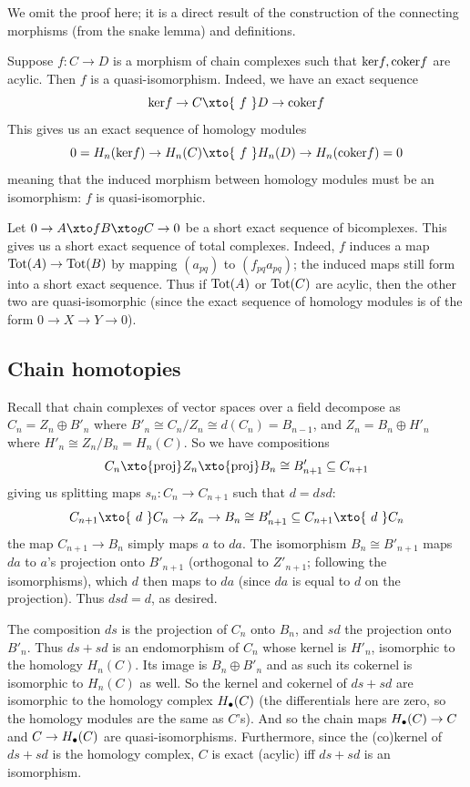 \eprop

We omit the proof here; it is a direct result of the construction of the connecting morphisms (from the snake lemma) and definitions.

\bexam

    Suppose $f\colon C\to D$ is a morphism of chain complexes such that ${\rm ker} f,{\rm coker} f$ are acylic.
    Then $f$ is a quasi-isomorphism.
    Indeed, we have an exact sequence
    $$ \ker f \to C \xto{\ f\ } D \to \coker f $$
    This gives us an exact sequence of homology modules
    $$ 0 = H_n(\ker f) \to H_n(C) \xto{\ f\ } H_n(D) \to H_n(\coker f) = 0 $$
    meaning that the induced morphism between homology modules must be an isomorphism: $f$ is quasi-isomorphic.

\eexam

\bexam

    Let $0\to A\xto f B\xto g C\to0$ be a short exact sequence of bicomplexes.
    This gives us a short exact sequence of total complexes.
    Indeed, $f$ induces a map ${\rm Tot}(A)\to{\rm Tot}(B)$ by mapping $(a_{pq})$ to $(f_{pq}a_{pq})$; the induced maps still form into a short exact sequence.
    Thus if ${\rm Tot}(A)$ or ${\rm Tot}(C)$ are acylic, then the other two are quasi-isomorphic (since the exact sequence of homology modules is of the form $0\to X\to Y\to0$).

\eexam

\subsection{Chain homotopies}

Recall that chain complexes of vector spaces over a field decompose as $C_n=Z_n\oplus B'_n$ where $B'_n\cong C_n/Z_n\cong d(C_n)=B_{n-1}$, and $Z_n=B_n\oplus H'_n$ where $H'_n\cong Z_n/B_n=H_n(C)$.
So we have compositions
$$ C_n \xto{\rm proj} Z_n \xto{\rm proj} B_n \cong B'_{n+1} \subseteq C_{n+1} $$
giving us splitting maps $s_n\colon C_n\to C_{n+1}$ such that $d=dsd$:
$$ C_{n+1} \xto{\ d\ } C_n \to Z_n \to B_n \cong B'_{n+1} \subseteq C_{n+1} \xto{\ d\ } C_n $$
the map $C_{n+1}\to B_n$ simply maps $a$ to $da$.
The isomorphism $B_n\cong B'_{n+1}$ maps $da$ to $a$'s projection onto $B'_{n+1}$ (orthogonal to $Z'_{n+1}$; following the isomorphisms), which $d$ then maps to $da$ (since $da$ is equal to $d$ on the projection).
Thus $dsd=d$, as desired.

The composition $ds$ is the projection of $C_n$ onto $B_n$, and $sd$ the projection onto $B'_n$.
Thus $ds+sd$ is an endomorphism of $C_n$ whose kernel is $H'_n$, isomorphic to the homology $H_n(C)$.
Its image is $B_n\oplus B'_n$ and as such its cokernel is isomorphic to $H_n(C)$ as well.
So the kernel and cokernel of $ds+sd$ are isomorphic to the homology complex $H_\bullet(C)$ (the differentials here are zero, so the homology modules are the same as $C$'s).
And so the chain maps $H_\bullet(C)\to C$ and $C\to H_\bullet(C)$ are quasi-isomorphisms.
Furthermore, since the (co)kernel of $ds+sd$ is the homology complex, $C$ is exact (acylic) iff $ds+sd$ is an isomorphism.

